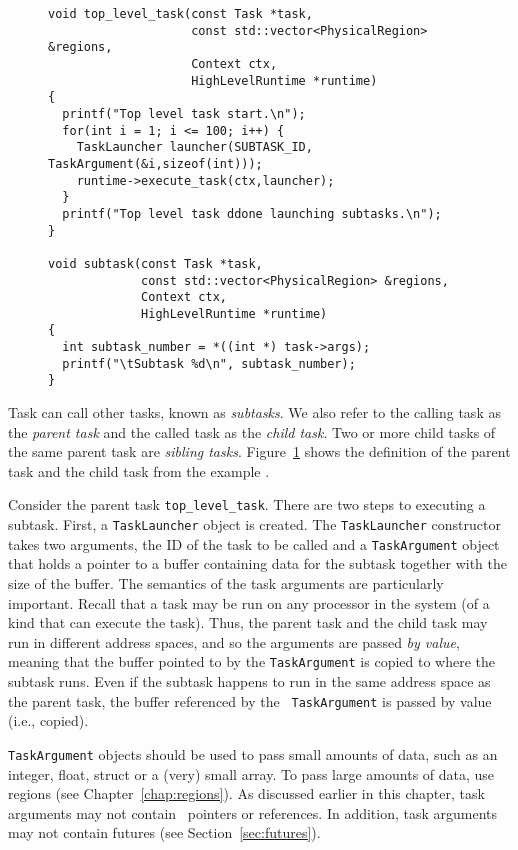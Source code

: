 \begin{figure}
\begin{lstlisting}
void top_level_task(const Task *task,
                    const std::vector<PhysicalRegion> &regions,
                    Context ctx,
                    HighLevelRuntime *runtime)
{
  printf("Top level task start.\n");
  for(int i = 1; i <= 100; i++) {
    TaskLauncher launcher(SUBTASK_ID, TaskArgument(&i,sizeof(int)));
    runtime->execute_task(ctx,launcher);
  }
  printf("Top level task ddone launching subtasks.\n");
}

void subtask(const Task *task,
             const std::vector<PhysicalRegion> &regions,
             Context ctx,
             HighLevelRuntime *runtime)
{
  int subtask_number = *((int *) task->args);
  printf("\tSubtask %d\n", subtask_number);
}
\end{lstlisting}
\caption{}
\label{fig:subtask}
\end{figure}



Task can call other tasks, known as {\em subtasks}.  We also refer to
the calling task as the {\em parent task} and the called task as the
{\em child task}.  Two or more child tasks of the same parent task are
{\em sibling tasks}.  Figure~\ref{fig:subtask} shows the definition of
the parent task and the child task from the example
.

Consider the parent task {\tt top\_level\_task}.  There are two steps
to executing a subtask.  First, a {\tt TaskLauncher} object is
created.  The {\tt TaskLauncher}
constructor takes two arguments, the ID of the task to be called and a
{\tt TaskArgument} object that holds a pointer to a buffer containing
data for the subtask together with the size of the buffer.  The
semantics of the task arguments are particularly important.  Recall
that a task may be run on any processor in the system (of a kind that
can execute the task).  Thus, the parent task and the child task may
run in different address spaces, and so the arguments are passed
{\em by value}, meaning that the buffer pointed to by the {\tt TaskArgument} is
copied to where the subtask runs.  Even if the subtask happens to run in the
same address space as the parent task, the buffer referenced by the {\tt
  TaskArgument} is passed by value (i.e., copied).  

{\tt TaskArgument} objects should be used to pass small amounts of data,
such as an integer, float, struct or a (very) small array.  To pass large amounts of
data, use regions (see Chapter~\ref{chap:regions}).  As
discussed earlier in this chapter, task arguments may not contain
\Cpp\ pointers or references.  In addition, task arguments may not contain
futures (see Section~\ref{sec:futures}).

